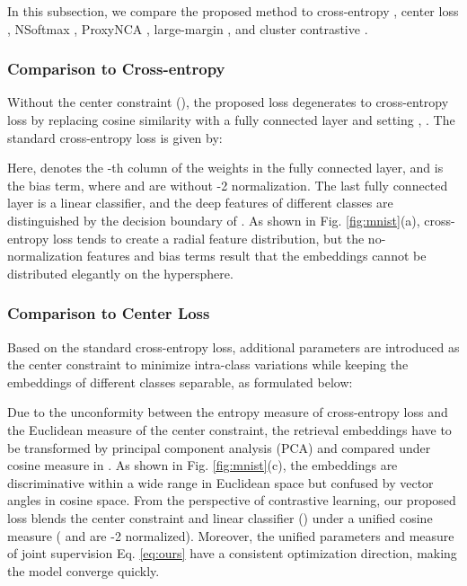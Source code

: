 \documentclass[10pt,twocolumn,letterpaper]{article}
\begin{document}
In this subsection, we compare the proposed method to cross-entropy \cite{ce}, center loss \cite{centerloss}, NSoftmax \cite{nsoftmax}, ProxyNCA \cite{proxynca}, large-margin \cite{cosface}, and cluster contrastive \cite{spcl,prism,cluster_contrast}.

\subsubsection{Comparison to Cross-entropy}\label{sec:ce}
Without the center constraint (), the proposed loss degenerates to cross-entropy loss by replacing cosine similarity with a fully connected layer  and setting , . The standard cross-entropy loss is given by:

Here,  denotes the -th column of the weights in the fully connected layer, and  is the bias term, where  and  are without -2 normalization. The last fully connected layer is a linear classifier, and the deep features of different classes are distinguished by the decision boundary of . As shown in Fig. \ref{fig:mnist}(a), cross-entropy loss tends to create a radial feature distribution, but the no-normalization features and bias terms result that the embeddings cannot be distributed elegantly on the hypersphere.

\subsubsection{Comparison to Center Loss}\label{sec:centerloss}
Based on the standard cross-entropy loss, additional parameters  are introduced as the center constraint to minimize intra-class variations while keeping the embeddings of different classes separable, as formulated below:

Due to the unconformity between the entropy measure of cross-entropy loss and the Euclidean measure of the center constraint, the retrieval embeddings have to be transformed by principal component analysis (PCA) and compared under cosine measure in \cite{centerloss}. As shown in Fig. \ref{fig:mnist}(c), the embeddings are discriminative within a wide range in Euclidean space but confused by vector angles in cosine space. From the perspective of contrastive learning, our proposed loss blends the center constraint and linear classifier () under a unified cosine measure ( and  are -2 normalized). Moreover, the unified parameters and measure of joint supervision Eq. \eqref{eq:ours} have a consistent optimization direction, making the model converge quickly.
\end{document}
